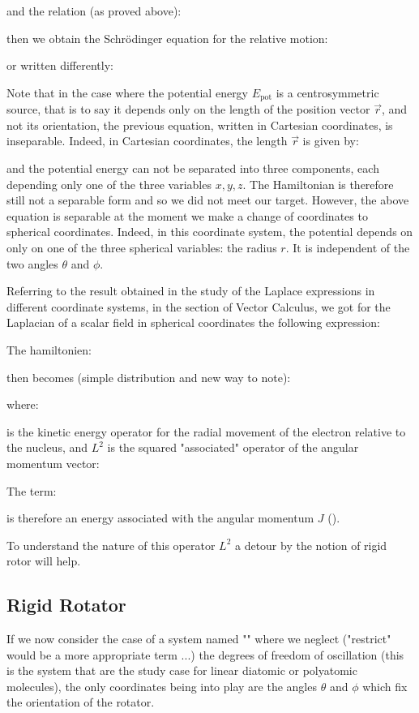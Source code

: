 	and the relation (as proved above):
	
	then we obtain the Schrödinger equation for the relative motion:
	
	or written differently:
	
	Note that in the case where the potential energy $E_{\text{pot}}$ is a centrosymmetric source, that is to say it depends only on the length of the position vector $\vec{r}$, and not its orientation, the previous equation, written in Cartesian coordinates, is inseparable. Indeed, in Cartesian coordinates, the length $\vec{r}$ is given by:
	
	and the potential energy can not be separated into three components, each depending only one of the three variables $x, y, z$. The Hamiltonian is therefore still not a separable form and so we did not meet our target. However, the above equation is separable at the moment we make a change of coordinates to spherical coordinates. Indeed, in this coordinate system, the potential depends on only on one of the three spherical variables: the radius $r$. It is independent of the two angles $\theta$ and $\phi$.
	
	Referring to the result obtained in the study of the Laplace expressions in different coordinate systems, in the section of Vector Calculus, we got for the Laplacian of a scalar field in spherical coordinates the following expression:
	
	The hamiltonien:
	
	then becomes (simple distribution and new way to note):
	
	where:
	
	is the kinetic energy operator for the radial movement of the electron relative to the nucleus, and $L^2$ is the squared "associated" operator of the angular momentum vector:
	
	The term:
	
	is therefore an energy associated with the angular momentum $J$ ().
	
	To understand the nature of this operator $L^2$ a detour by the notion of rigid rotor will help.
	
	\subsection{Rigid Rotator}
	If we now consider the case of a system named "" where we neglect ("restrict" would be a more appropriate term ...) the degrees of freedom of oscillation (this is the system that are the study case for linear diatomic or polyatomic molecules), the only coordinates being into play are the angles $\theta$ and $\phi$ which fix the orientation of the rotator.
	
